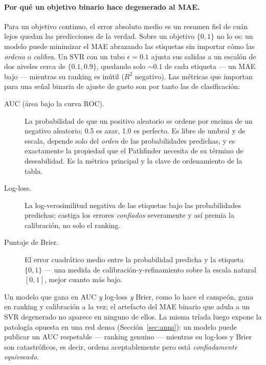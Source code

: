 \documentclass[11pt]{article}
\newcommand{\rsq}{$R^2$}
\begin{document}
\paragraph{Por qué un objetivo binario hace degenerado al MAE.} Para un objetivo
continuo, el error absoluto medio es un resumen fiel de cuán lejos quedan las
predicciones de la verdad. Sobre un objetivo $\{0,1\}$ no lo es: un modelo puede
minimizar el MAE abrazando las etiquetas sin importar cómo las \emph{ordena} o
\emph{calibra}. Un SVR con un tubo $\epsilon{=}0.1$ ajusta sus salidas a un
escalón de dos niveles cerca de $\{0.1,0.9\}$, quedando solo $\sim 0.1$ de cada
etiqueta --- un MAE bajo --- mientras su ranking es inútil (\rsq{} negativo). Las
métricas que importan para una señal binaria de ajuste de gusto son por tanto las
de clasificación:
\begin{description}
  \item[AUC (área bajo la curva ROC).] La probabilidad de que un positivo
  aleatorio se ordene por encima de un negativo aleatorio; \num{0.5} es azar,
  \num{1.0} es perfecto. Es libre de umbral y de escala, depende solo del
  \emph{orden} de las probabilidades predichas, y es exactamente la propiedad que
  el Pathfinder necesita de su término de deseabilidad. Es la métrica principal y
  la clave de ordenamiento de la tabla.
  \item[Log-loss.] La log-verosimilitud negativa de las etiquetas bajo las
  probabilidades predichas; castiga los errores \emph{confiados} severamente y
  así premia la calibración, no solo el ranking.
  \item[Puntaje de Brier.] El error cuadrático medio entre la probabilidad
  predicha y la etiqueta $\{0,1\}$ --- una medida de calibración-y-refinamiento
  sobre la escala natural $[0,1]$, mejor cuanto más bajo.
\end{description}
Un modelo que gana en AUC \emph{y} log-loss \emph{y} Brier, como lo hace el
campeón, gana en ranking y calibración a la vez; el artefacto del MAE binario que
adula a un SVR degenerado no aparece en ninguno de ellos. La misma tríada luego
expone la patología opuesta en una red densa (Sección~\ref{sec:anns}): un modelo
puede publicar un AUC respetable --- ranking genuino --- mientras su log-loss y
Brier son catastróficos, es decir, ordena aceptablemente pero está
\emph{confiadamente equivocado}.
\end{document}
